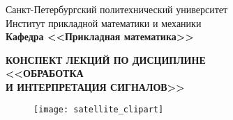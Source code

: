 \documentclass[main.tex]{subfiles}
\begin{document}
\begin{titlepage}
\begin{center}
	\begin{large}
		Санкт-Петербургский политехнический университет\\
		Институт прикладной математики и механики\\
		\textbf{Кафедра <<Прикладная математика>>}\\
	\end{large}
	\vfill
	\Large{\textbf{КОНСПЕКТ ЛЕКЦИЙ ПО ДИСЦИПЛИНЕ \\
			 <<ОБРАБОТКА \\
			 И ИНТЕРПРЕТАЦИЯ СИГНАЛОВ>>}}
\end{center}
\vfill
\begin{figure}[H]
	\centering \texttt{[image: satellite\_clipart]}
\end{figure}
\vfill
{}
\end{titlepage}
\end{document}
